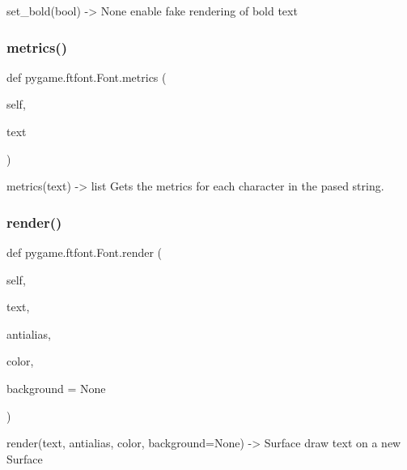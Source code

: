\begin{DoxyVerb}set_bold(bool) -> None
   enable fake rendering of bold text\end{DoxyVerb}
 \mbox{\label{classpygame_1_1ftfont_1_1_font_a4d6c9f2508f8e2d124fbbaea401a2817}} 
\subsubsection{\texorpdfstring{metrics()}{metrics()}}
{\footnotesize\ttfamily def pygame.\+ftfont.\+Font.\+metrics (\begin{DoxyParamCaption}\item[{}]{self,  }\item[{}]{text }\end{DoxyParamCaption})}

\begin{DoxyVerb}metrics(text) -> list
   Gets the metrics for each character in the pased string.\end{DoxyVerb}
 \mbox{\label{classpygame_1_1ftfont_1_1_font_a49e5ca8d0ca3fbbbc75d46bd6e4351ff}} 
\subsubsection{\texorpdfstring{render()}{render()}}
{\footnotesize\ttfamily def pygame.\+ftfont.\+Font.\+render (\begin{DoxyParamCaption}\item[{}]{self,  }\item[{}]{text,  }\item[{}]{antialias,  }\item[{}]{color,  }\item[{}]{background = {\ttfamily None} }\end{DoxyParamCaption})}

\begin{DoxyVerb}render(text, antialias, color, background=None) -> Surface
   draw text on a new Surface\end{DoxyVerb}
 \mbox{\label{classpygame_1_1ftfont_1_1_font_aff7afcc8a28bf56f82e0bd7fbe83187f}} 
